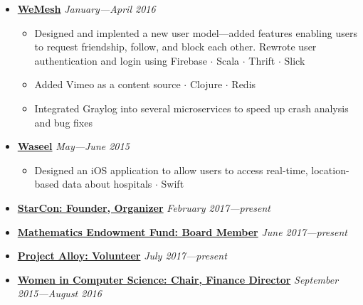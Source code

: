 \documentclass[5pt,letterpaper]{article}
\newcommand{\dt}{$\cdot$ }
\begin{document}
\begin{itemize}[leftmargin=1em, noitemsep]
  \item[]
    {\href{http://www.rave.io}{\textbf{WeMesh}} \hfill
    \emph{January---April 2016}}

    \begin{itemize}[label=\textbullet, noitemsep, nosep]
      \item Designed and implented a new user model---added features enabling
        users to request friendship, follow, and block each other. Rewrote user
        authentication and login using Firebase \dt Scala \dt Thrift \dt Slick
      \item Added Vimeo as a content source \dt Clojure \dt Redis
      \item Integrated Graylog into several microservices to speed up crash
        analysis and bug fixes
    \end{itemize}

  \item[]
    {\href{https://www.waseel.com}{\textbf{Waseel}} \hfill
    \emph{May---June 2015}}

    \begin{itemize}[label=\textbullet, noitemsep]
      \item Designed an iOS application to allow users to access real-time,
        location-based data about hospitals \dt Swift
    \end{itemize}

  \item[]
    {\href{https://starcon.io}{\textbf{StarCon: Founder, Organizer}} \hfill
    \emph{February 2017---present}}

  \item[]
    {\href{https://uwaterloo.ca/math-endowment-fund/}{\textbf{Mathematics
    Endowment Fund: Board Member}} \hfill \emph{June 2017---present}}

  \item[]
    {\href{https://www.projectalloy.org/}{\textbf{Project Alloy: Volunteer}} \hfill
    \emph{July 2017---present}}

  \item[]
    {\href{http://wics.uwaterloo.ca}{\textbf{Women in Computer Science: Chair,
      Finance Director}} \hfill
    \emph{September 2015---August 2016}}

\end{itemize}
\end{document}
